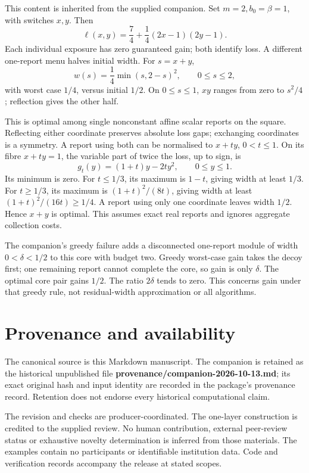 \documentclass[
  british,
  11pt,
  a4paper,
]{article}
\begin{document}
This content is inherited from the supplied companion. Set
\(m=2,b_0=\beta=1\), with switches \(x,y\). Then \[
\ell(x,y)=\frac74+\frac14(2x-1)(2y-1).
\] Each individual exposure has zero guaranteed gain; both identify
loss. A different one-report menu halves initial width. For \(s=x+y\),
\[
w(s)=\frac14\min(s,2-s)^2,\qquad0\le s\le2,
\] with worst case \(1/4\), versus initial \(1/2\). On \(0\le s\le1\),
\(xy\) ranges from zero to \(s^2/4\); reflection gives the other half.

This is optimal among single nonconstant affine scalar reports on the
square. Reflecting either coordinate preserves absolute loss gaps;
exchanging coordinates is a symmetry. A report using both can be
normalised to \(x+t y\), \(0<t\le1\). On its fibre \(x+t y=1\), the
variable part of twice the loss, up to sign, is \[
g_t(y)=(1+t)y-2t y^2,\qquad0\le y\le1.
\] Its minimum is zero. For \(t\le1/3\), its maximum is \(1-t\), giving
width at least \(1/3\). For \(t\ge1/3\), its maximum is
\((1+t)^2/(8t)\), giving width at least \((1+t)^2/(16t)\ge1/4\). A
report using only one coordinate leaves width \(1/2\). Hence \(x+y\) is
optimal. This assumes exact real reports and ignores aggregate
collection costs.

The companion's greedy failure adds a disconnected one-report module of
width \(0<\delta<1/2\) to this core with budget two. Greedy worst-case
gain takes the decoy first; one remaining report cannot complete the
core, so gain is only \(\delta\). The optimal core pair gains \(1/2\).
The ratio \(2\delta\) tends to zero. This concerns gain under that
greedy rule, not residual-width approximation or all algorithms.

\section{Provenance and availability}\label{provenance-and-availability}

The canonical source is this Markdown manuscript. The companion is
retained as the historical unpublished file
\textbf{provenance/companion-2026-10-13.md}; its exact original hash and
input identity are recorded in the package's provenance record.
Retention does not endorse every historical computational claim.

The revision and checks are producer-coordinated. The one-layer
construction is credited to the supplied review. No human contribution,
external peer-review status or exhaustive novelty determination is
inferred from those materials. The examples contain no participants or
identifiable institution data. Code and verification records accompany
the release at stated scopes.
\end{document}
